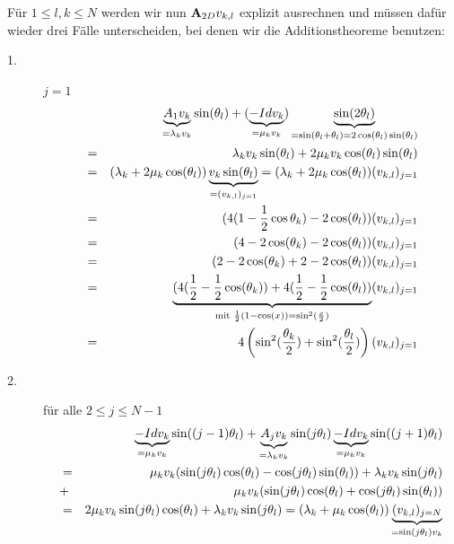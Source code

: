 Für $1 \le l,k \le N$ werden wir nun ${\textbf{A}}_{2D} v_{k,l}$ explizit ausrechnen und müssen dafür wieder drei Fälle unterscheiden, bei denen wir die Additionstheoreme benutzen:
\begin{description}
\item[1.] $j = 1$
\begin{eqnarray}
&&\underbrace{A_{1} v_{k}}_{=\lambda_{k} v_{k}} \sin(\theta_{l}) + (\underbrace{-Id v_{k}}_{= \mu_{k} v_{k}}) \underbrace{\sin(2\theta_{l})}_{= \sin(\theta_{l} + \theta_{l}) = 2\cos({\theta_{l})\sin({\theta_{l}})}} \notag \\
&=& \lambda_{k}v_{k}\sin(\theta_{l}) + 2\mu_{k}v_{k}\cos(\theta_{l})\sin(\theta_{l}) \notag \\
&=& (\lambda_{k} + 2\mu_{k}\cos(\theta_{l})) \underbrace{v_{k}\sin(\theta_{l})}_{= (v_{k,l})_{j=1}} = (\lambda_{k} + 2\mu_{k}\cos(\theta_{l}))(v_{k,l})_{j=1} \notag \\
&=& (4(1 - \frac{1}{2}\cos{\theta_{k}}) - 2\cos(\theta_{l})) (v_{k,l})_{j=1} \notag \\
&=& (4 - 2\cos(\theta_{k}) - 2\cos(\theta_{l})) (v_{k,l})_{j=1} \notag \\
&=& (2 - 2\cos(\theta_{k}) + 2 - 2\cos(\theta_{l})) (v_{k,l})_{j=1} \notag \\
&=& \underbrace{(4(\frac{1}{2} - \frac{1}{2}\cos(\theta_{k})) + 4(\frac{1}{2} - \frac{1}{2}\cos(\theta_{l}))}_{\textnormal{mit } \frac{1}{2}(1 - \cos(x)) = \sin^{2}(\frac{x}{2})} (v_{k,l})_{j=1} \notag \\
&=& 4 \left(\sin^{2}(\frac {\theta_{k}} {2}) + \sin^{2}(\frac {\theta_{l}} {2})\right) (v_{k,l})_{j=1}\notag
\end{eqnarray}
\item[2.] für alle $2 \le j \le N-1$
\begin{eqnarray}
&&\underbrace{-Id v_{k}}_{= \mu_{k} v_{k}} \sin((j-1) \theta_{l}) + \underbrace{A_{j} v_{k}}_{=\lambda_{k} v_{k}} \sin(j\theta_{l}) \underbrace{- Id v_{k}}_{= \mu_{k} v_{k}} \sin((j+1) \theta_{l}) \notag \\
&=& \mu_{k} v_{k} (\sin(j\theta_{l})\cos(\theta_{l}) - \cos(j\theta_{l})\sin(\theta_{l})) + \lambda_{k} v_{k} \sin(j\theta_{l}) \notag \\
&+& \mu_{k} v_{k} (\sin(j\theta_{l})\cos(\theta_{l}) + \cos(j\theta_{l})\sin(\theta_{l})) \notag \\
&=& 2 \mu_{k} v_{k} \sin(j\theta_{l})\cos(\theta_{l}) + \lambda_{k} v_{k} \sin(j\theta_{l}) = (\lambda_{k} + \mu_{k} \cos(\theta_{l})) \underbrace{(v_{k,l})_{j=N}}_{= \sin(j\theta_{l}) v_{k}} \notag \\

\end{eqnarray}
\end{description}
